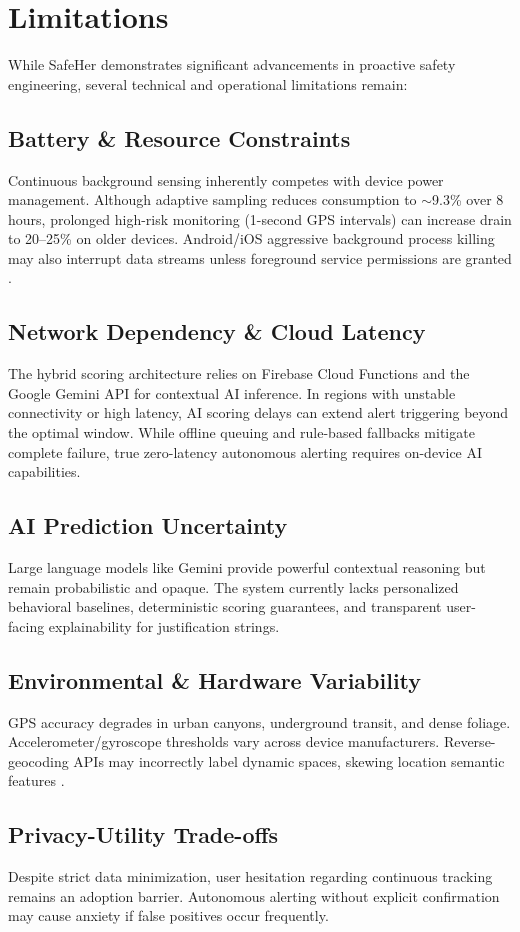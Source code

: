 \section{Limitations}

While SafeHer demonstrates significant advancements in proactive safety engineering, several technical and operational limitations remain:

\subsection{Battery \& Resource Constraints}
Continuous background sensing inherently competes with device power management. Although adaptive sampling reduces consumption to $\sim$9.3\% over 8 hours, prolonged high-risk monitoring (1-second GPS intervals) can increase drain to 20--25\% on older devices. Android/iOS aggressive background process killing may also interrupt data streams unless foreground service permissions are granted \cite{nguyen2023}.

\subsection{Network Dependency \& Cloud Latency}
The hybrid scoring architecture relies on Firebase Cloud Functions and the Google Gemini API for contextual AI inference. In regions with unstable connectivity or high latency, AI scoring delays can extend alert triggering beyond the optimal window. While offline queuing and rule-based fallbacks mitigate complete failure, true zero-latency autonomous alerting requires on-device AI capabilities.

\subsection{AI Prediction Uncertainty}
Large language models like Gemini provide powerful contextual reasoning but remain probabilistic and opaque. The system currently lacks personalized behavioral baselines, deterministic scoring guarantees, and transparent user-facing explainability for justification strings.

\subsection{Environmental \& Hardware Variability}
GPS accuracy degrades in urban canyons, underground transit, and dense foliage. Accelerometer/gyroscope thresholds vary across device manufacturers. Reverse-geocoding APIs may incorrectly label dynamic spaces, skewing location semantic features \cite{google_geo2024}.

\subsection{Privacy-Utility Trade-offs}
Despite strict data minimization, user hesitation regarding continuous tracking remains an adoption barrier. Autonomous alerting without explicit confirmation may cause anxiety if false positives occur frequently.
